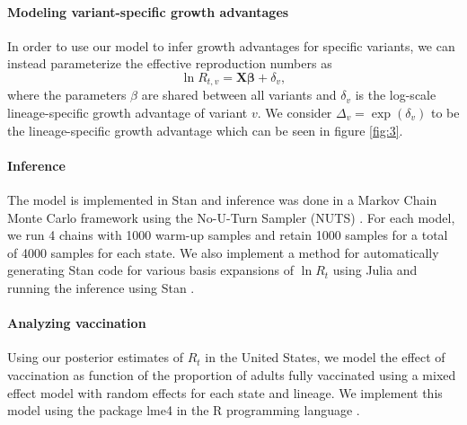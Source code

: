 \documentclass[11pt,oneside,letterpaper]{article}
\renewcommand{\vec}[1]{\boldsymbol{#1}}
\begin{document}
\paragraph{Modeling variant-specific growth advantages}%

In order to use our model to infer growth advantages for specific variants, we can instead parameterize the effective reproduction numbers as
\begin{equation}
\ln R_{t,v} = \vec{X} \vec{\beta} + \delta_{v},
\end{equation}
where the parameters $\beta$ are shared between all variants and $\delta_{v}$ is the log-scale lineage-specific growth advantage of variant $v$.
We consider $\Delta_{v} = \exp(\delta_{v})$ to be the lineage-specific growth advantage which can be seen in figure \ref{fig:3}.

\paragraph{Inference}

The model is implemented in Stan \cite{carpenter2017stan} and inference was done in a Markov Chain Monte Carlo framework using the No-U-Turn Sampler (NUTS) \cite{hoffman2011nouturn}.
For each model, we run 4 chains with 1000 warm-up samples and retain 1000 samples for a total of 4000 samples for each state.
We also implement a method for automatically generating Stan code for various basis expansions of $\ln R_{t}$ using Julia \cite{bezanson2017julia} and running the inference using Stan \cite{carpenter2017stan}.

\paragraph{Analyzing vaccination}

Using our posterior estimates of $R_{t}$ in the United States, we model the effect of vaccination as function of the proportion of adults fully vaccinated using a mixed effect model with random effects for each state and lineage. We implement this model using the package lme4 \cite{Bates2015} in the R programming language \cite{RLang2017}.


\end{document}
